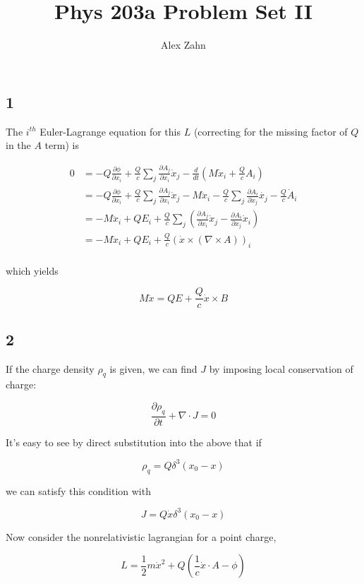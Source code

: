 \documentclass[12pt]{article}
\author{Alex Zahn}
\title{Phys 203a Problem Set II}
\date{}
\begin{document}
\maketitle
\subsection*{1}

The \(i^{th}\) Euler-Lagrange equation for this \(L\) (correcting for the missing factor of \(Q\) in the \(A\) term) is

\begin{align*}
0 &= -Q \frac{\partial \phi}{\partial x_i} + \frac{Q}{c}\sum_j\frac{\partial A_j}{\partial x_i}\dot{x}_j - \frac{d}{dt}\left( M\dot{x}_i  + \frac{Q}{c} A_i\right)\\
&= -Q \frac{\partial \phi}{\partial x_i} + \frac{Q}{c}\sum_j\frac{\partial A_j}{\partial x_i}\dot{x}_j - M\ddot{x}_i  - \frac{Q}{c} \sum_j \frac{\partial A_i}{\partial x_j}\dot{x_j} - \frac{Q}{c}\dot{A}_i\\
&= -M\ddot{x}_i + QE_i + \frac{Q}{c}\sum_j \left( \frac{\partial A_j}{\partial x_i}\dot{x}_j-\frac{\partial A_i}{\partial x_j}\dot{x}_i\right) \\
&= -M\ddot{x}_i + QE_i + \frac{Q}{c} (\dot{x} \times (\nabla \times A))_i \\
\end{align*}

which yields

\[ M\ddot{x} = QE + \frac{Q}{c}\dot{x} \times B
\]

\subsection*{2}

If the charge density \(\rho_q\) is given, we can find \(J\) by imposing local conservation of charge:

\[\frac{\partial \rho_q}{\partial t} + \nabla \cdot J = 0
\]

It's easy to see by direct substitution into the above that if 

\[\rho_q = Q\delta^3(x_0 - x)\]

we can satisfy this condition with

\[J = Q\dot{x}\delta^3(x_0-x)
\]

Now consider the nonrelativistic lagrangian for a point charge,

\[ L = \frac{1}{2}m\dot{x}^2 + Q(\frac{1}{c}\dot{x}\cdot A -\phi)
\]
\end{document}

